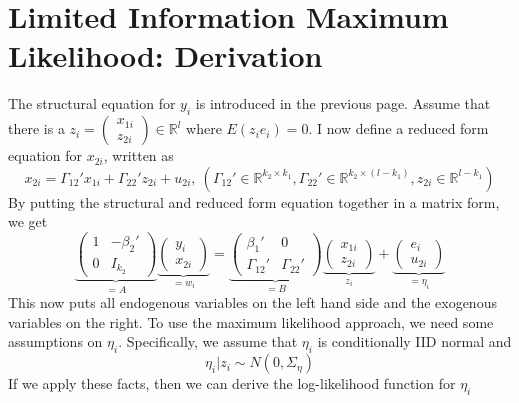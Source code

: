 \section{Limited Information Maximum Likelihood: Derivation}
The structural equation for $y_i$ is introduced in the previous page. Assume that there is a $z_i = \begin{pmatrix} x_{1i}\\ z_{2i}\end{pmatrix}\in\mathbb{R}^l$ where $E(z_ie_i)=0$. I now define a reduced form equation for $x_{2i}$, written as
\[
x_{2i}=\Gamma_{12}'x_{1i}+\Gamma_{22}'z_{2i}+u_{2i},\  (\Gamma_{12}'\in\mathbb{R}^{k_2\times k_1}, \Gamma_{22}'\in\mathbb{R}^{k_2\times (l-k_1)},z_{2i}\in\mathbb{R}^{l-k_1})
\]
By putting the structural and reduced form equation together in a matrix form, we get
\[
\underbrace{\begin{pmatrix}1 &- \beta_2' \\ 0  & I_{k_2} \end{pmatrix}}_{=A}\underbrace{\begin{pmatrix} y_i \\ x_{2i} \end{pmatrix}}_{=w_i}
= \underbrace{\begin{pmatrix}\beta_1' &0 \\ \Gamma_{12}'  & \Gamma_{22}' \end{pmatrix}}_{=B}\underbrace{\begin{pmatrix} x_{1i} \\ z_{2i} \end{pmatrix}}_{z_i} + \underbrace{\begin{pmatrix} e_i \\ u_{2i} \end{pmatrix}}_{=\eta_i}
\]
This now puts all endogenous variables on the left hand side and the exogenous variables on the right. To use the maximum likelihood approach, we need some assumptions on $\eta_i$. Specifically, we assume that $\eta_i$ is conditionally IID normal and
\[
\eta_i |z_i\sim N(0,\Sigma_\eta)
\]
If we apply these facts, then we can derive the log-likelihood function for $\eta_i$
